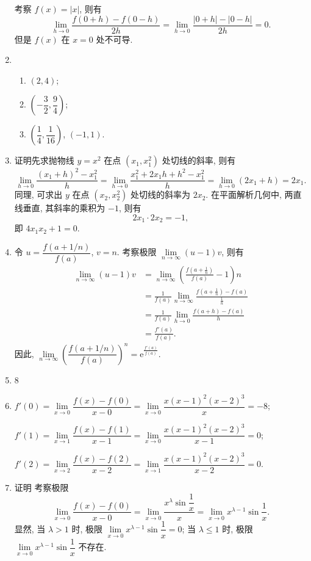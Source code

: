 \documentclass[a4paper, 11pt]{ctexart}
\begin{document}
\begin{enumerate}
        考察 $f(x) = |x|$, 则有
        \[
            \lim_{h\to0}\frac{f(0+h) - f(0-h)}{2h} = \lim_{h\to0}\frac{|0+h| - |0-h|}{2h} = 0.
        \]
        但是 $f(x)$ 在 $x = 0$ 处不可导.
    \item %
        \begin{enumerate}[(1)]
            \item %
                $(2, 4)$;
            \item %
                $\left(-\dfrac32, \dfrac94\right)$;
            \item %
                $\left(\dfrac14, \dfrac{1}{16}\right)$, $(-1, 1)$.
        \end{enumerate}
    \item %
        {\heiti 证明}\quad 先求抛物线 $y = x^2$ 在点 $(x_1, x_1^2)$ 处切线的斜率, 则有
        \[
            \lim_{h\to0}\frac{(x_1+h)^2 - x_1^2}{h} = \lim_{h\to0}\frac{x_1^2 + 2x_1h + h^2 - x_1^2}{h} = \lim_{h\to0}(2x_1 + h) = 2x_1.    
        \]
        同理, 可求出 $y$ 在点 $(x_2, x_2^2)$ 处切线的斜率为 $2x_2$. 在平面解析几何中, 两直线垂直, 其斜率的乘积为 $-1$, 则有
        \[
            2x_1\cdot2x_2 = -1,    
        \]
        即 $4x_1x_2 + 1 = 0$.
    \item %
        令 $u = \dfrac{f(a + 1/n)}{f(a)}$, $v = n$. 考察极限 $\lim\limits_{n\to\infty}(u - 1)v$, 则有
        \begin{align*}
            \lim_{n\to\infty}(u - 1)v &= \lim_{n\to\infty}\left(\frac{f(a + \frac1n)}{f(a)} - 1\right)n \\
                                      &= \frac{1}{f(a)}\lim_{n\to\infty}\frac{f(a+\frac1n) - f(a)}{\frac1n} \\
                                      &= \frac{1}{f(a)}\lim_{h\to0}\frac{f(a+h) - f(a)}{h} \\
                                      &= \frac{f'(a)}{f(a)}.
        \end{align*}
        因此, $\lim\limits_{n\to\infty}\left(\dfrac{f(a + 1/n)}{f(a)}\right)^n = \mathrm{e}^{\frac{f'(a)}{f(a)}}$.
    \item 8
    \item %
        $f'(0) = \lim\limits_{x\to0}\dfrac{f(x) - f(0)}{x - 0} = \lim\limits_{x\to0}\dfrac{x(x-1)^2(x-2)^3}{x} = -8$;

        $f'(1) = \lim\limits_{x\to1}\dfrac{f(x) - f(1)}{x - 1} = \lim\limits_{x\to0}\dfrac{x(x-1)^2(x-2)^3}{x-1} = 0$;

        $f'(2) = \lim\limits_{x\to2}\dfrac{f(x) - f(2)}{x - 2} = \lim\limits_{x\to1}\dfrac{x(x-1)^2(x-2)^3}{x - 2} = 0$.
    \item %
        {\heiti 证明} 考察极限
        \[
            \lim_{x\to0}\frac{f(x) - f(0)}{x - 0} = \lim_{x\to0}\frac{x^\lambda\sin\dfrac1x}{x} = \lim_{x\to0}x^{\lambda - 1}\sin\frac1x.    
        \]
        显然, 当 $\lambda > 1$ 时, 极限 $\lim\limits_{x\to0}x^{\lambda - 1}\sin\dfrac1x = 0$; 当 $\lambda \leqslant 1$ 时, 极限 $\lim\limits_{x\to0}x^{\lambda - 1}\sin\dfrac1x$ 不存在.
\end{enumerate}
\end{document}

